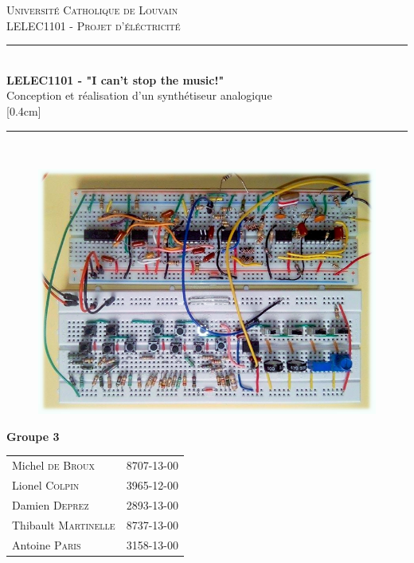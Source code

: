 \documentclass{scrreprt}
\begin{document}
\begin{titlepage}
\newcommand{\HRule}{\rule{\linewidth}{0.5mm}} 
\center 
\textsc{\Large Universit\'e Catholique de Louvain}\\[1cm] 
\textsc{\LARGE LELEC1101 - Projet d'éléctricité}\\[0.5cm] 

\HRule \\[0.4cm]
{ \huge \bfseries LELEC1101 - "I can't stop the music!"}\\
{\LARGE Conception et réalisation d'un synthétiseur analogique}\\[0.5cm] 
[0.4cm] \HRule \\[0.1cm]

\begin{figure}[ht]
\centering
\includegraphics [scale=0.85] {cover}
\end{figure}

{ \Large
\begin{center}
\textbf{Groupe 3}
\end{center}
}

\begin{minipage}{0.7\textwidth}
\begin{center}
\begin{tabular}{lc}
Michel \textsc{de Broux} & 8707-13-00 \\
Lionel \textsc{Colpin} & 3965-12-00 \\
Damien \textsc{Deprez} & 2893-13-00 \\
Thibault \textsc{Martinelle} & 8737-13-00 \\
Antoine \textsc{Paris} & 3158-13-00 \\
\end{tabular}
\end{center}


\end{minipage}
\end{titlepage}
\end{document}
